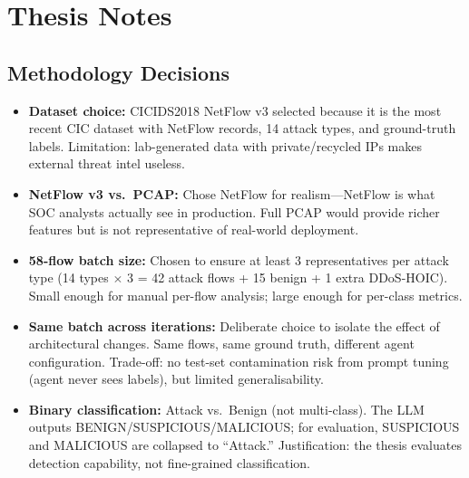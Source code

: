 \documentclass[12pt, a4paper, oneside]{report}
\begin{document}
\part{Thesis Notes}
\label{part:notes}


\chapter{Methodology Decisions}
\label{ch:method-notes}

\begin{itemize}[leftmargin=2em]
  \item \textbf{Dataset choice:} CICIDS2018 NetFlow v3 selected because it is
        the most recent CIC dataset with NetFlow records, 14 attack types, and
        ground-truth labels. Limitation: lab-generated data with private/recycled
        IPs makes external threat intel useless.

  \item \textbf{NetFlow v3 vs.\ PCAP:} Chose NetFlow for realism---NetFlow is
        what SOC analysts actually see in production. Full PCAP would provide
        richer features but is not representative of real-world deployment.

  \item \textbf{58-flow batch size:} Chosen to ensure at least 3 representatives
        per attack type (14 types $\times$ 3 = 42 attack flows + 15 benign +
        1 extra DDoS-HOIC). Small enough for manual per-flow analysis;
        large enough for per-class metrics.

  \item \textbf{Same batch across iterations:} Deliberate choice to isolate
        the effect of architectural changes. Same flows, same ground truth,
        different agent configuration. Trade-off: no test-set contamination
        risk from prompt tuning (agent never sees labels), but limited
        generalisability.

  \item \textbf{Binary classification:} Attack vs.\ Benign (not multi-class).
        The LLM outputs BENIGN/SUSPICIOUS/MALICIOUS; for evaluation, SUSPICIOUS
        and MALICIOUS are collapsed to ``Attack.'' Justification: the thesis
        evaluates detection capability, not fine-grained classification.


\end{itemize}
\end{document}
